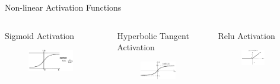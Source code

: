 \documentclass[10pt]{beamer}
\begin{document}
\begin{frame}{Non-linear Activation Functions}
    \begin{columns}
        \begin{block}{Sigmoid Activation}
             \begin{figure}
                  \centering
                   \includegraphics[width=0.85\textwidth]{Images/sigmoid.png}
            \end{figure}
        \end{block}
        
        \begin{block}{Hyperbolic Tangent Activation}
             \begin{figure}
                  \centering
                   \includegraphics[width=0.85\textwidth]{Images/hypertan.png}
            \end{figure}
        \end{block}

        \begin{block}{Relu Activation}
             \begin{figure}
                  \centering
                   \includegraphics[width=0.6\textwidth]{Images/relu.png}
            \end{figure}
        \end{block} 
        

\end{columns}
\end{frame}
\end{document}
